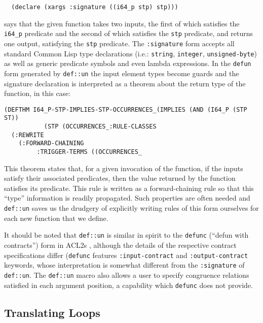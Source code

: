 \documentclass{eptcs}
\begin{document}
\begin{verbatim}
  (declare (xargs :signature ((i64_p stp) stp)))
\end{verbatim}

says that the given function takes two inputs, the first of which
satisfies the \texttt{i64\_p} predicate and the second of which
satisfies the \texttt{stp} predicate, and returns one output,
satisfying the \texttt{stp} predicate.  The \texttt{:signature} form
accepts all standard Common Lisp type declarations (i.e.:
\texttt{string}, \texttt{integer}, \texttt{unsigned-byte}) as well as
generic predicate symbols and even lambda expressions.  In the
\texttt{defun} form generated by \texttt{def::un} the input element
types become guards and the signature declaration is interpreted as a
theorem about the return type of the function, in this case:

\begin{verbatim}
(DEFTHM I64_P-STP-IMPLIES-STP-OCCURRENCES_(IMPLIES (AND (I64_P (STP ST))
           (STP (OCCURRENCES_:RULE-CLASSES
  (:REWRITE
    (:FORWARD-CHAINING
         :TRIGGER-TERMS ((OCCURRENCES_\end{verbatim}

This theorem states that, for a given invocation of the function, if
the inputs satisfy their associated predicates, then the value
returned by the function satisfies its predicate.  This rule is
written as a forward-chaining rule so that this ``type'' information
is readily propagated.  Such properties are
often needed and \texttt{def::un} saves us the drudgery of explicitly
writing rules of this form ourselves for each new function that we
define.

It should be noted that \texttt{def::un} is similar in spirit to the
\texttt{defunc} (``defun with contracts'') form in ACL2s \cite{ACL2s},
although the details of the respective contract specifications differ
(\texttt{defunc} features \texttt{:input-contract} and
\texttt{:output-contract} keywords, whose interpretation is somewhat
different from the \texttt{:signature} of \texttt{def::un}.  The 
\texttt{def::un} macro also allows a user to specify congruence relations
satisfied in each argument position, a capability which
\texttt{defunc} does not provide.

\subsection{Translating Loops}
\end{document}
